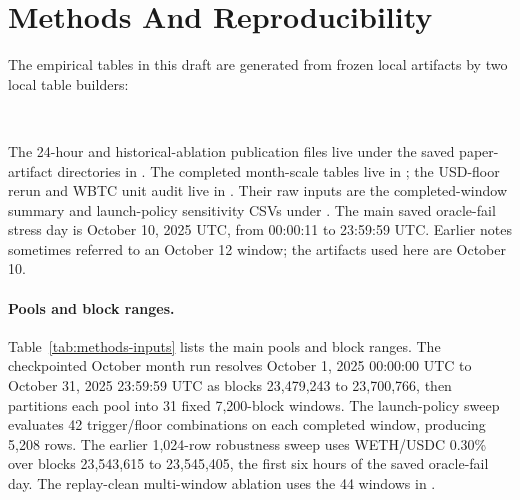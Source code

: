 \documentclass[11pt]{article}
\begin{document}
\section{Methods And Reproducibility}

The empirical tables in this draft are generated from frozen local artifacts by two local table builders:
\begin{center}
\\
\end{center}
The 24-hour and historical-ablation publication files live under the saved paper-artifact directories in . The completed month-scale tables live in ; the USD-floor rerun and WBTC unit audit live in . Their raw inputs are the completed-window summary and launch-policy sensitivity CSVs under . The main saved oracle-fail stress day is October 10, 2025 UTC, from 00:00:11 to 23:59:59 UTC. Earlier notes sometimes referred to an October 12 window; the artifacts used here are October 10.

\paragraph{Pools and block ranges.}
Table~\ref{tab:methods-inputs} lists the main pools and block ranges. The checkpointed October month run resolves October 1, 2025 00:00:00 UTC to October 31, 2025 23:59:59 UTC as blocks 23,479,243 to 23,700,766, then partitions each pool into 31 fixed 7,200-block windows. The launch-policy sweep evaluates 42 trigger/floor combinations on each completed window, producing 5,208 rows. The earlier 1,024-row robustness sweep uses WETH/USDC 0.30\% over blocks 23,543,615 to 23,545,405, the first six hours of the saved oracle-fail day. The replay-clean multi-window ablation uses the 44 windows in .
\end{document}

